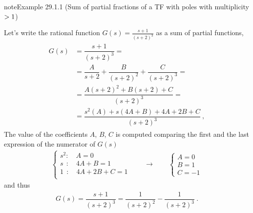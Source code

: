 \documentclass[letterpaper,10pt,english]{jupyterBook}
\begin{document}
\begin{sphinxadmonition}{note}{Example 29.1.1 (Sum of partial fractions of a TF with poles with multiplicity \protect\(> 1\protect\))}



\sphinxAtStartPar
Let’s write the rational function \(G(s) = \frac{s+1}{(s+2)^3}\) as a sum of partial functions,
\begin{equation*}
\begin{split}\begin{aligned}
  G(s)
  & = \dfrac{s+1}{(s+2)^3} = \\
  & = \dfrac{A}{s+2} + \dfrac{B}{(s+2)^2} + \dfrac{C}{(s+2)^3} = \\
  & = \dfrac{A(s+2)^2+B(s+2)+C}{(s+2)^3} = \\
  & = \dfrac{s^2(A) + s(4A + B) + 4A+2B+C}{(s+2)^3} \ ,
\end{aligned}\end{split}
\end{equation*}
\sphinxAtStartPar
The value of the coefficients \(A\), \(B\), \(C\) is computed comparing the first and the last expression of the numerator of \(G(s)\)
\begin{equation*}
\begin{split}\begin{cases}
  s^2  : \quad A = 0 \\
  s\ \ : \quad 4A + B = 1 \\
  1\ \ : \quad 4A + 2B + C = 1 \\
\end{cases}
\qquad \rightarrow \qquad
\begin{cases}
 A =  0 \\
 B =  1 \\
 C = -1
\end{cases}\end{split}
\end{equation*}
\sphinxAtStartPar
and thus
\begin{equation*}
\begin{split}G(s) =  \dfrac{s+1}{(s+2)^3} = \dfrac{1}{(s+2)^2} - \dfrac{1}{(s+2)^3} \ . \end{split}
\end{equation*}\end{sphinxadmonition}
\end{document}
